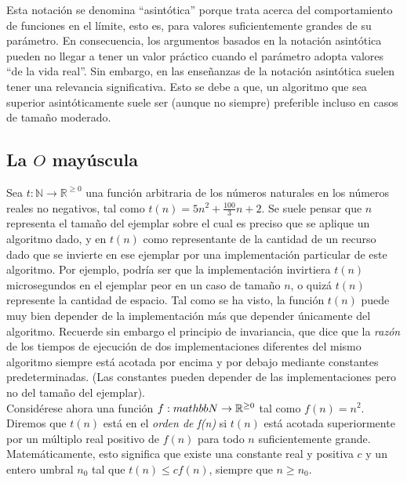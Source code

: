 Esta notación se denomina ``asintótica'' porque trata acerca del comportamiento de funciones en el límite, esto es, para valores suficientemente grandes de su parámetro. En consecuencia, los argumentos basados en la notación asintótica pueden no llegar a tener un valor práctico cuando el parámetro adopta valores ``de la vida real''. Sin embargo, en las enseñanzas de la notación asintótica suelen tener una relevancia significativa. Esto se debe a que, un algoritmo que sea superior asintóticamente suele ser (aunque no siempre) preferible incluso en casos de tamaño moderado.\\

\subsection{La $O$ mayúscula}

Sea $t: \mathbb{N} \rightarrow \mathbb{R}^{\geq 0}$ una función arbitraria de los números naturales en los números reales no negativos, tal como $t(n) = 5n^2 + \frac{100}{3}n + 2$. Se suele pensar que $n$ representa el tamaño del ejemplar sobre el cual es preciso que se aplique un algoritmo dado, y en $t(n)$ como representante de la cantidad de un recurso dado que se invierte en ese ejemplar por una implementación particular de este algoritmo. Por ejemplo, podría ser que la implementación invirtiera $t(n)$ microsegundos en el ejemplar peor en un caso de tamaño $n$, o quizá $t(n)$ represente la cantidad de espacio. Tal como se ha visto, la función $t(n)$ puede muy bien depender de la implementación más que depender únicamente del algoritmo. Recuerde sin embargo el principio de invariancia, que dice que la \emph{razón} de los tiempos de ejecución de dos implementaciones diferentes del mismo algoritmo siempre está acotada por encima y por debajo mediante constantes predeterminadas. (Las constantes pueden depender de las implementaciones pero no del tamaño del ejemplar).\\

Considérese ahora una función $f: \\mathbb{N} \rightarrow \mathbb{R}^{\geq 0}$ tal como $f(n) = n^2$. Diremos que $t(n)$ está en el \emph{orden de f(n)} si $t(n)$ está acotada superiormente por un múltiplo real positivo de $f(n)$ para todo $n$ suficientemente grande. Matemáticamente, esto significa que existe una constante real y positiva $c$ y un entero umbral $n_0$ tal que $t(n) \leq cf(n)$, siempre que $n \geq n_0$.\\

